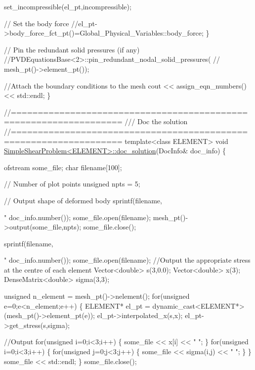 \begin{DoxyCodeInclude}
   set\_incompressible(el\_pt,incompressible);
   
   \textcolor{comment}{// Set the body force}
   \textcolor{comment}{//el\_pt->body\_force\_fct\_pt()=Global\_Physical\_Variables::body\_force;}
  \}
 
 \textcolor{comment}{// Pin the redundant solid pressures (if any)}
 \textcolor{comment}{//PVDEquationsBase<2>::pin\_redundant\_nodal\_solid\_pressures(}
 \textcolor{comment}{// mesh\_pt()->element\_pt());}

 \textcolor{comment}{//Attach the boundary conditions to the mesh}
 cout << assign\_eqn\_numbers() << std::endl; 
\} 


\textcolor{comment}{//==================================================================}\textcolor{comment}{}
\textcolor{comment}{/// Doc the solution}
\textcolor{comment}{}\textcolor{comment}{//==================================================================}
\textcolor{keyword}{template}<\textcolor{keyword}{class} ELEMENT>
\textcolor{keywordtype}{void} \hyperlink{classSimpleShearProblem_a24c087d9ea194229930bcf9f889a048e}{SimpleShearProblem<ELEMENT>::doc\_solution}(DocInfo& doc\_info)
\{

 ofstream some\_file;
 \textcolor{keywordtype}{char} filename[100];

 \textcolor{comment}{// Number of plot points}
 \textcolor{keywordtype}{unsigned} npts = 5; 

 \textcolor{comment}{// Output shape of deformed body}
 sprintf(filename,\textcolor{stringliteral}{"%
         doc\_info.number());
 some\_file.open(filename);
 mesh\_pt()->output(some\_file,npts);
 some\_file.close();
 
 sprintf(filename,\textcolor{stringliteral}{"%
         doc\_info.number());
 some\_file.open(filename);
 \textcolor{comment}{//Output the appropriate stress at the centre of each element}
 Vector<double> s(3,0.0);
 Vector<double> x(3);
 DenseMatrix<double> sigma(3,3);
 
 \textcolor{keywordtype}{unsigned} n\_element = mesh\_pt()->nelement();
 \textcolor{keywordflow}{for}(\textcolor{keywordtype}{unsigned} e=0;e<n\_element;e++)
  \{
   ELEMENT* el\_pt = \textcolor{keyword}{dynamic\_cast<}ELEMENT*\textcolor{keyword}{>}(mesh\_pt()->element\_pt(e));
   el\_pt->interpolated\_x(s,x);
   el\_pt->get\_stress(s,sigma);

   \textcolor{comment}{//Output}
   \textcolor{keywordflow}{for}(\textcolor{keywordtype}{unsigned} i=0;i<3;i++)
    \{
     some\_file << x[i] << \textcolor{stringliteral}{" "};
    \}
   \textcolor{keywordflow}{for}(\textcolor{keywordtype}{unsigned} i=0;i<3;i++)
    \{
     \textcolor{keywordflow}{for}(\textcolor{keywordtype}{unsigned} j=0;j<3;j++)
      \{
       some\_file << sigma(i,j) << \textcolor{stringliteral}{" "};
      \}
    \}
   some\_file << std::endl;
  \}
 some\_file.close();

}}
\end{DoxyCodeInclude}
